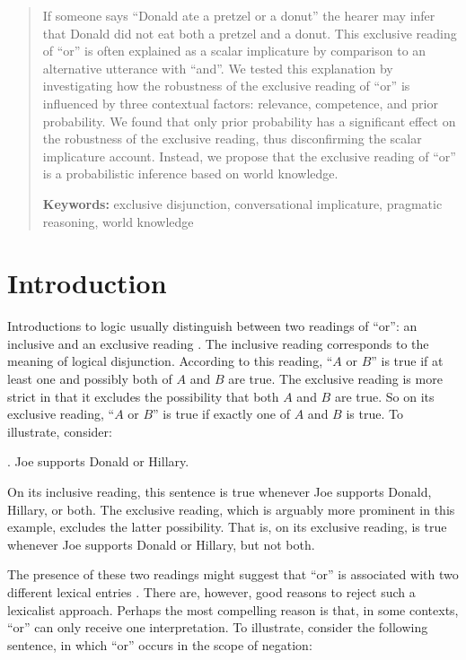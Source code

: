 \documentclass[12pt]{article}
\begin{document}
\begin{abstract}
  If someone says ``Donald ate a pretzel or a donut'' the hearer may infer that Donald did not
  eat both a pretzel and a donut. This exclusive reading of ``or'' is often explained as a
  scalar implicature by comparison to an alternative utterance with ``and''. We tested this
  explanation by investigating how the robustness of the exclusive reading of ``or'' is
  influenced by three contextual factors: relevance, competence, and prior probability. We
  found that only prior probability has a significant effect on the robustness of the exclusive
  reading, thus disconfirming the scalar implicature account. Instead, we propose that the
  exclusive reading of ``or'' is a probabilistic inference based on world knowledge.

  \textbf{Keywords:} exclusive disjunction, conversational implicature, pragmatic reasoning, world knowledge
\end{abstract}

\section{Introduction}

Introductions to logic usually distinguish between two readings of ``or'': an inclusive and an exclusive reading \citep[e.g.,][]{mccawley1981, copi2005}. The inclusive reading corresponds to the meaning of logical disjunction. According to this reading, ``$A$ or $B$'' is true if at least one and possibly both of $A$ and $B$ are true. The exclusive reading is more strict in that it excludes the possibility that both $A$ and $B$ are true. So on its exclusive reading, ``$A$ or $B$'' is true if exactly one of $A$ and $B$ is true. To illustrate, consider:

\ex.	\label{ex:support} Joe supports Donald or Hillary.

On its inclusive reading, this sentence is true whenever Joe supports Donald, Hillary, or both. The exclusive reading, which is arguably more prominent in this example, excludes the latter possibility. That is, on its exclusive reading, \Last is true whenever Joe supports Donald or Hillary, but not both.

The presence of these two readings might suggest that ``or'' is associated with two different lexical entries \citep[e.g.,][]{basson1960, baum1996, rescher1964}. There are, however, good reasons to reject such a lexicalist approach. Perhaps the most compelling reason is that, in some contexts, ``or'' can only receive one interpretation. To illustrate, consider the following sentence, in which ``or'' occurs in the scope of negation:
\end{document}

